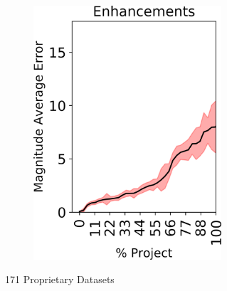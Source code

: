 \begin{figure}[tp!]
\begin{subfigure}[t]{\linewidth}
\begin{subfigure}[t]{0.33\linewidth}
		\includegraphics[width=\linewidth]{images/RQ1/inhouse/Enhancements.png}
	\end{subfigure}%
	\caption{171 Proprietary Datasets}
	\end{subfigure}
	\\
	\begin{subfigure}[t]{\linewidth}
	\begin{subfigure}[t]{0.33\linewidth}
	\centering

\end{subfigure}
\end{subfigure}
\end{figure}

